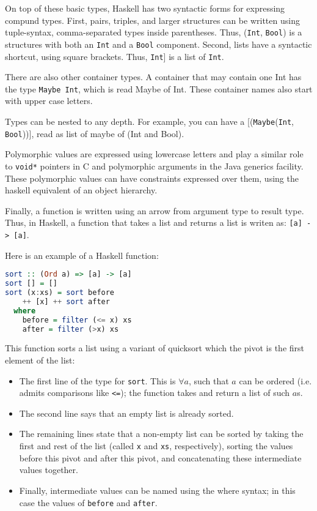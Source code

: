 On top of these basic types, Haskell has two syntactic forms for expressing
compund types. First, pairs, triples, and larger structures can be written
using tuple-syntax, comma-separated types inside parentheses. Thus,
(\texttt{Int}, \texttt{Bool}) is a structures with both an \texttt{Int} and a
\texttt{Bool} component. Second, lists have a syntactic shortcut, using square
brackets. Thus, \texttt{Int}] is a list of \texttt{Int}.

There are also other container types. A container that may contain one Int has
the type \texttt{Maybe Int}, which is read Maybe of Int. These container names
also start with upper case letters.

Types can be nested to any depth. For example, you can have a
[(\texttt{Maybe}(\texttt{Int}, \texttt{Bool}))], read as list of maybe of (Int
and Bool).

Polymorphic values are expressed using lowercase letters and play a similar
role to \texttt{void*} pointers in C and polymorphic arguments in the Java
generics facility. These polymorphic values can have constraints expressed over
them, using the haskell equivalent of an object hierarchy.

Finally, a function is written using an arrow from argument type to result
type. Thus, in Haskell, a function that takes a list and returns a list is
writen as: \texttt{[a] -> [a]}.

Here is an example of a Haskell function:

\begin{lstlisting}[language=Haskell]
sort :: (Ord a) => [a] -> [a]
sort [] = []
sort (x:xs) = sort before
    ++ [x] ++ sort after
  where 
    before = filter (<= x) xs
    after = filter (>x) xs
\end{lstlisting}

This function sorts a list using a variant of quicksort which the pivot is the first element of the list:
\begin{itemize} 
\item The first line of the type for \texttt{sort}. This is $\forall a$, such
that $a$ can be ordered (i.e. admits comparisons like \texttt{<=}); the
function takes and return a list of such $a$s.  
\item The second line says that an empty list is already sorted.  
\item The remaining lines state that a non-empty list can be sorted by taking
the first and rest of the list (called \texttt{x} and \texttt{xs},
respectively), sorting the values before this pivot and after this pivot, and
concatenating these intermediate values together.  
\item Finally, intermediate values can be named using the where syntax; in this
case the values of \texttt{before} and \texttt{after}.
\end{itemize}

